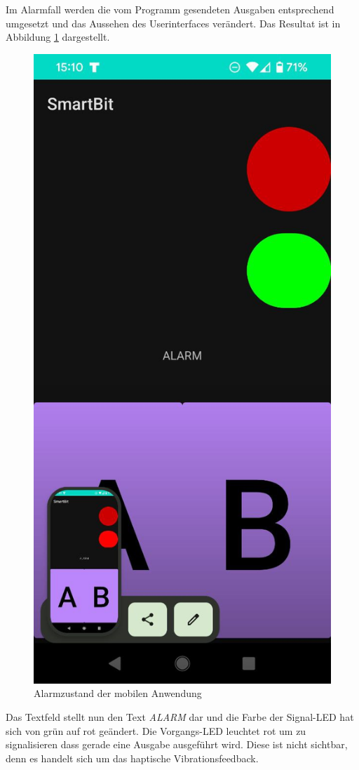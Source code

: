 \documentclass[11pt,a4paper]{report}
\begin{document}
Im Alarmfall werden die vom Programm gesendeten Ausgaben entsprechend umgesetzt und das Aussehen des Userinterfaces verändert.
Das Resultat ist in Abbildung \ref{fig:app_alarm} dargestellt.
\begin{figure}[htbp]
  \centering
  \includegraphics[height=0.4\textheight]{images/app_alarm}
  \caption{Alarmzustand der mobilen Anwendung}
  \label{fig:app_alarm}
\end{figure}
Das Textfeld stellt nun den Text \textit{ALARM} dar und die Farbe der Signal-LED hat sich von grün auf rot geändert.
Die Vorgangs-LED leuchtet rot um zu signalisieren dass gerade eine Ausgabe ausgeführt wird.
Diese ist nicht sichtbar, denn es handelt sich um das haptische Vibrationsfeedback.
\end{document}
